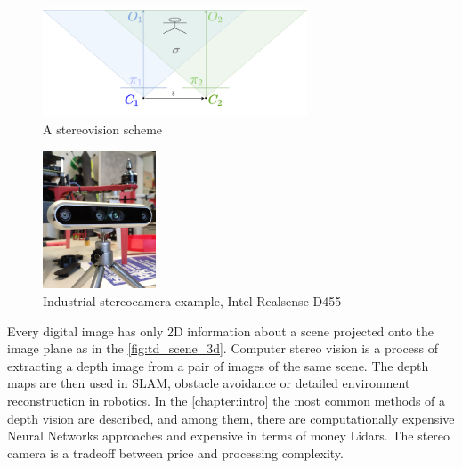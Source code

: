 \begin{figure}[h]
    \centering
    \includegraphics[width=0.7\textwidth]{graphics/stereopair.png}
    \caption{A stereovision scheme}
    \label{fig:sch_stereo}
\end{figure}
\begin{figure}[h]
    \centering
    \includegraphics[width=0.3\textwidth]{graphics/stereo_example.jpg}
    \caption{Industrial stereocamera example, Intel Realsense D455}
    \label{fig:stereo_ex}
\end{figure}


Every digital image has only 2D information about a scene projected onto the image plane as in the \autoref{fig:td_scene_3d}.
Computer stereo vision is a process of extracting a depth image from a pair of images of the same scene. 
The depth maps are then used in SLAM, obstacle avoidance or detailed environment reconstruction in robotics.
In the \autoref{chapter:intro} the most common methods of a depth vision are described, and among them, there are computationally expensive Neural Networks approaches and expensive in terms of money Lidars.
The stereo camera is a tradeoff between price and processing complexity.

